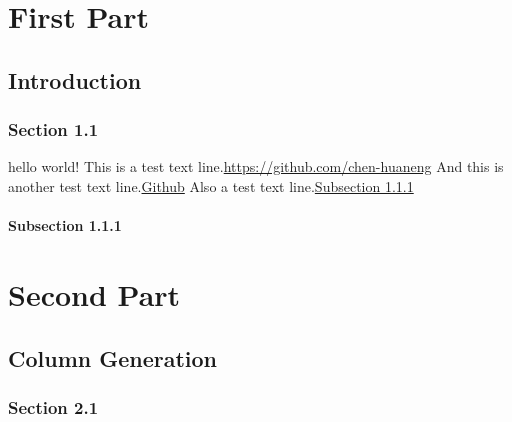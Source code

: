 \documentclass{note}
\begin{document}
\mainmatter

% 
% 
% 
% 
% 
% 

\part{First Part}

\chapter{Introduction}

\section{Section 1.1}

hello world!\cite{2015The} This is a test text line.\url{https://github.com/chen-huaneng} And this is another test text line.\href{https://github.com/chen-huaneng}{Github} Also a test text line.\hyperref[test]{Subsection 1.1.1}

\lipsum[5-10]

\subsection{Subsection 1.1.1}\label{test}

\lipsum[5-10]

\part{Second Part}

\chapter{Column Generation}

\lipsum[5-10]

\section{Section 2.1}

\lipsum[5-10]

\backmatter
\end{document}
